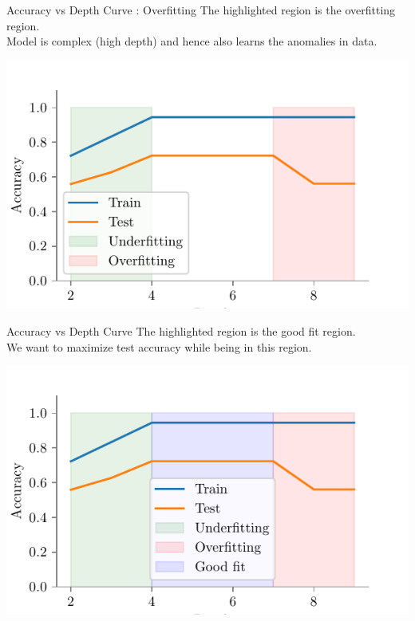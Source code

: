 \documentclass{beamer}
\begin{document}
\begin{frame}{Accuracy vs Depth Curve : Overfitting}
The highlighted region is the overfitting region.\\
Model is complex (high depth) and hence also learns the anomalies in data. 
\begin{center}
\includegraphics{../figures/decision-trees/bias-variance-accuracy-vs-depth-overfitting.pdf}
\end{center}
\end{frame}

\begin{frame}{Accuracy vs Depth Curve }
The highlighted region is the good fit region.\\
We want to maximize test accuracy while being in this region.
\begin{center}
\includegraphics{../figures/decision-trees/bias-variance-accuracy-vs-depth-good-fit.pdf}
\end{center}
\end{frame}
\end{document}
